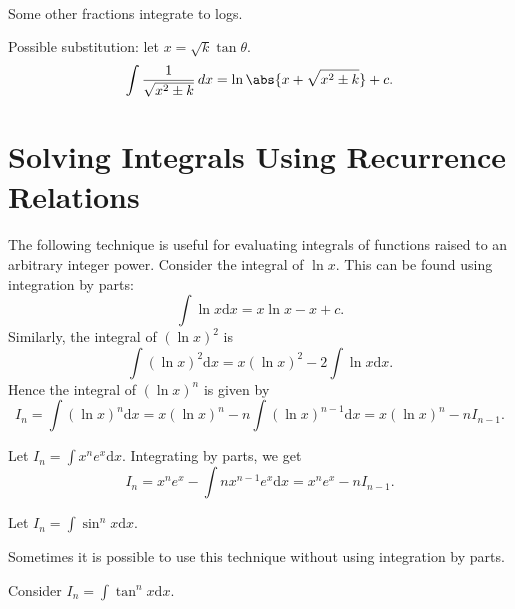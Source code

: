 \documentclass[../multivariate_calculus.tex]{subfiles}
\begin{document}
        \paragraph{}
        Some other fractions integrate to logs.
        \begin{example}
            Possible substitution: let $x=\sqrt{k}\tan\theta$.
            \begin{equation*}
                \int\frac{1}{\sqrt{x^2\pm k}}\,dx = \ln\abs{x+\sqrt{x^2\pm k}}+c.
            \end{equation*}
        \end{example}

    \section{Solving Integrals Using Recurrence Relations}
        \paragraph{}
        The following technique is useful for evaluating integrals of functions raised to an arbitrary integer power.
        Consider the integral of $\ln x$.
        This can be found using integration by parts:
        \begin{equation}
            \int\ln x\mathrm{d}x=x\ln x-x+c.
        \end{equation}
        Similarly, the integral of $(\ln x)^2$ is
        \begin{equation}
            \int(\ln x)^2\mathrm{d}x=x(\ln x)^2-2\int\ln x\mathrm{d}x.
        \end{equation}
        Hence the integral of $(\ln x)^n$ is given by
        \begin{equation}
            I_n=\int(\ln x)^n\mathrm{d}x=x(\ln x)^n-n\int(\ln x)^{n-1}\mathrm{d}x=x(\ln x)^n-nI_{n-1}.
        \end{equation}
        \begin{example}
            Let $I_n=\int x^ne^x\mathrm{d}x$.
            Integrating by parts, we get
            \begin{equation}
                I_n=x^ne^x-\int nx^{n-1}e^x\mathrm{d}x=x^ne^x-nI_{n-1}.
            \end{equation}
        \end{example}
        \begin{example}
            Let $I_n=\int\sin^nx\mathrm{d}x$.
        \end{example}
        Sometimes it is possible to use this technique without using integration by parts.
        \begin{example}
            Consider $I_n=\int\tan^nx\mathrm{d}x$.
        \end{example}
\end{document}

